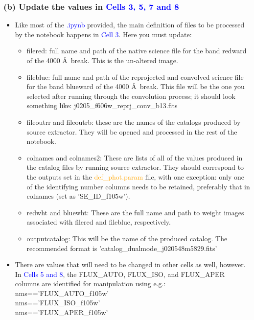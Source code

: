 \documentclass[a4paper,10pt]{article}
\begin{document}
\subsubsection{(b) Update the values in \textcolor{blue}{Cells 3, 5, 7 and 8}}

\begin{itemize}
 \item
Like most of the \textcolor{blue}{.ipynb} provided, the main definition of files to be processed by the notebook happens in \textcolor{blue}{Cell 3}. Here you must update:

\begin{itemize}
\setlength{\itemsep}{-2pt}
 \item filered: full name and path of the native science file for the band redward of the 4000 \AA \ break. This is the un-altered image. 
 \item fileblue: full name and path of the reprojected and convolved science file for the band blueward of the 4000 \AA \ break. This file will be the one you selected after running through the convolution process; it should look something like: j0205\_f606w\_reprj\_conv\_b13.fits
 \item fileoutrr and fileoutrb: these are the names of the catalogs produced by source extractor. They will be opened and processed in the rest of the notebook.
 \item colnames and colnames2: These are lists of all of the values produced in the catalog files by running source extractor. They should correspond to the outputs set in the \textcolor{orange}{def\_phot.param} file, with one exception: only one of the identifying number columns needs to be retained, preferably that in colnames (set as 'SE\_ID\_f105w'). 
 \item redwht and bluewht: These are the full name and path to weight images associated with filered and fileblue, respectively. 
 \item outputcatalog: This will be the name of the produced catalog. The recommended format is 'catalog\_dualmode\_j020548m5829.fits'
\end{itemize}

    \item
There are values that will need to be changed in other cells as well, however. In \textcolor{blue}{Cells 5 and 8}, the FLUX\_AUTO, FLUX\_ISO, and FLUX\_APER columns are identified for manipulation using e.g.:\\

\noindent nms=='FLUX\_AUTO\_f105w'\\
nms=='FLUX\_ISO\_f105w'\\
nms=='FLUX\_APER\_f105w'\\


\end{itemize}
\end{document}
